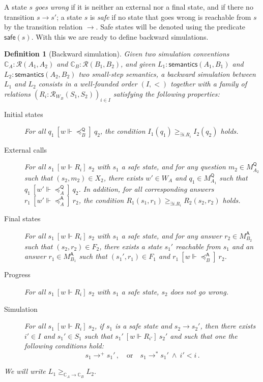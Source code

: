 \documentclass{article}
\newtheorem{definition}{Definition}
\newcommand{\kw}[1]{\ensuremath{ \mathsf{#1} }}
\newcommand{\ifr}[1]{\ [{#1}]\ }
\begin{document}
A state $s$ \emph{goes wrong}
if it is neither an external nor a final state,
and if there no transition $s \rightarrow s'$;
a state $s$ is \emph{safe}
if no state that goes wrong is reachable from $s$
by the transition relation $\rightarrow$.
Safe states will be denoted using the predicate $\kw{safe}(s)$.
With this we are ready to define backward simulations.

\begin{definition}[Backward simulation]
Given
two simulation conventions
$\mathbb{C}_A : \mathcal{R}(A_1, A_2)$ and
$\mathbb{C}_B : \mathcal{R}(B_1, B_2)$,
and given
$L_1 : \kw{semantics}(A_1, B_1)$ and
$L_2 : \kw{semantics}(A_2, B_2)$
two small-step semantics,
a \emph{backward simulation} between $L_1$ and $L_2$
consists in a
well-founded order $(I, <)$
together with a family of relations
$(R_i : \mathcal{R}_{W_B}(S_1, S_2))_{i \in I}$
satisfying the following properties:
\begin{description}
\item[Initial states]
  For all
  $q_1 \ifr{w \Vdash {\preceq}_B^\kw{Q}} q_2$,
  the condition $I_1(q_1) \ge_{\exists i . R_i} I_2(q_2)$ holds.
\item[External calls]
  For all $s_1 \ifr{w \Vdash R_i} s_2$
  with $s_1$ a safe state, and
  for any question $m_2 \in M_{A_2}^\kw{Q}$
  such that $(s_2, m_2) \in X_2$,
  there exists $w' \in W_A$ and $q_1 \in M_{A_1}^\kw{Q}$
  such that $q_1 \ifr{w' \Vdash {\preceq}_A^\kw{Q}} q_2$.
  In addition, for all corresponding answers
  $r_1 \ifr{w' \Vdash {\preceq}_A^\kw{A}} r_2$,
  the condition $R_1(s_1, r_1) \ge_{\exists i . R_i} R_2(s_2, r_2)$ holds.
\item[Final states]
  For all $s_1 \ifr{w \Vdash R_i} s_2$
  with $s_1$ a safe state, and
  for any answer $r_2 \in M_{B_2}^\kw{A}$
  such that $(s_2, r_2) \in F_2$,
  there exists a state $s_1'$ reachable from $s_1$ and
  an answer $r_1 \in M_{B_1}^\kw{A}$ such that
  $(s_1', r_1) \in F_1$ and $r_1 \ifr{w \Vdash {\preceq}_B^\kw{A}} r_2$.
\item[Progress]
  For all $s_1 \ifr{w \Vdash R_i} s_2$
  with $s_1$ a safe state,
  $s_2$ does not go wrong.
\item[Simulation]
  For all $s_1 \ifr{w \Vdash R_i} s_2$,
  if $s_1$ is a safe state and $s_2 \rightarrow s_2'$,
  then there exists $i' \in I$ and $s_1' \in S_1$
  such that $s_1' \ifr{w \Vdash R_{i'}} s_2'$ and
  such that one the following conditions hold:
  \[
    s_1 \rightarrow^+ s_1' \,, \quad \mbox{or} \quad
    s_1 \rightarrow^* s_1' \:\wedge\: i' < i \,.
  \]
\end{description}
We will write $L_1 \ge_{\mathbb{C}_A \rightarrow \mathbb{C}_B} L_2$.
\end{definition}
\end{document}
